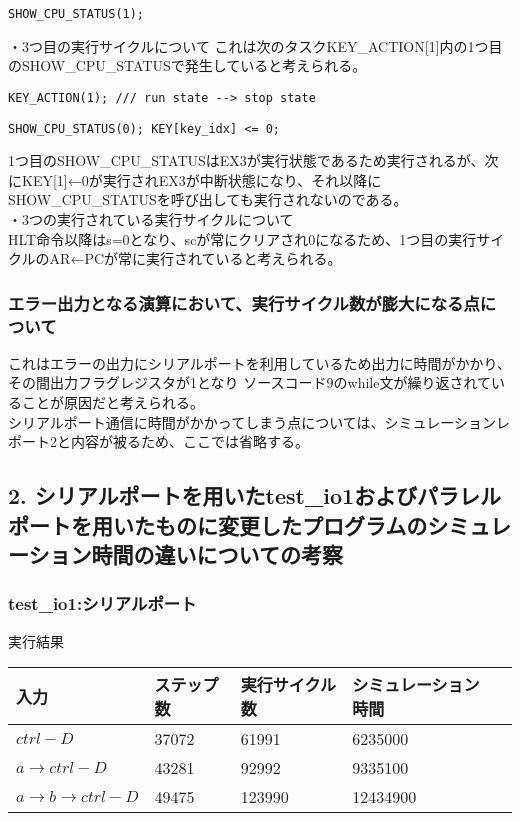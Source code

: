\documentclass{jsarticle}
\begin{document}
\begin{lstlisting}[caption=test\_fpga\_ex3.v 265行目]
SHOW_CPU_STATUS(1);
\end{lstlisting}

・3つ目の実行サイクルについて
これは次のタスクKEY\_ACTION[1]内の1つ目のSHOW\_CPU\_STATUSで発生していると考えられる。 \\

\begin{lstlisting}[caption=test\_fpga\_ex3.v 268行目]
KEY_ACTION(1); /// run state --> stop state
\end{lstlisting}

\begin{lstlisting}[caption=test\_fpga\_ex3.v 225行目]
SHOW_CPU_STATUS(0); KEY[key_idx] <= 0;
\end{lstlisting}

1つ目のSHOW\_CPU\_STATUSはEX3が実行状態であるため実行されるが、次にKEY[1]←0が実行されEX3が中断状態になり、それ以降にSHOW\_CPU\_STATUSを呼び出しても実行されないのである。 \\

・3つの実行されている実行サイクルについて \\
HLT命令以降はs=0となり、scが常にクリアされ0になるため、1つ目の実行サイクルのAR←PCが常に実行されていると考えられる。 \\

\subsubsection*{エラー出力となる演算において、実行サイクル数が膨大になる点について}
これはエラーの出力にシリアルポートを利用しているため出力に時間がかかり、その間出力フラグレジスタが1となり
ソースコード9のwhile文が繰り返されていることが原因だと考えられる。 \\
シリアルポート通信に時間がかかってしまう点については、シミュレーションレポート2と内容が被るため、ここでは省略する。 \\

\newpage

\subsection*{2. シリアルポートを用いたtest\_io1およびパラレルポートを用いたものに変更したプログラムのシミュレーション時間の違いについての考察}



\subsubsection*{test\_io1:シリアルポート}
実行結果
\begin{table}[h]
  \begin{tabular}{|l|l|l|l|l|} \hline
    入力 & ステップ数 & 実行サイクル数 & シミュレーション時間 \\ \hline
    $ctrl-D$ & 37072 & 61991 & 6235000 \\ \hline
    $a→ctrl-D$ & 43281 & 92992 & 9335100 \\ \hline
    $a→b→ctrl-D$ & 49475 & 123990 & 12434900 \\ \hline
  \end{tabular}
\end{table}
\end{document}
